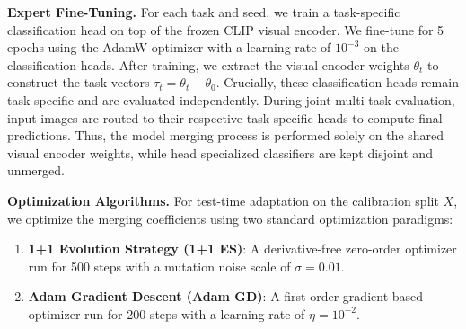 \textbf{Expert Fine-Tuning.} For each task and seed, we train a task-specific classification head on top of the frozen CLIP visual encoder. We fine-tune for 5 epochs using the AdamW optimizer \cite{adamw} with a learning rate of $10^{-3}$ on the classification heads. After training, we extract the visual encoder weights $\theta_t$ to construct the task vectors $\tau_t = \theta_t - \theta_0$. Crucially, these classification heads remain task-specific and are evaluated independently. During joint multi-task evaluation, input images are routed to their respective task-specific heads to compute final predictions. Thus, the model merging process is performed solely on the shared visual encoder weights, while head specialized classifiers are kept disjoint and unmerged.

\textbf{Optimization Algorithms.} For test-time adaptation on the calibration split $X$, we optimize the merging coefficients using two standard optimization paradigms:
\begin{enumerate}
    \item \textbf{1+1 Evolution Strategy (1+1 ES)}: A derivative-free zero-order optimizer run for 500 steps with a mutation noise scale of $\sigma = 0.01$.
    \item \textbf{Adam Gradient Descent (Adam GD)}: A first-order gradient-based optimizer run for 200 steps with a learning rate of $\eta = 10^{-2}$.
\end{enumerate}


